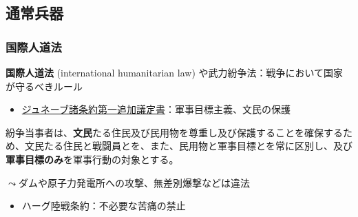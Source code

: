 \documentclass[
  xelatex,
  ja=standard]{bxjsarticle}
\providecommand{\tightlist}{%
  \setlength{\itemsep}{0pt}\setlength{\parskip}{0pt}}\usepackage{longtable,booktabs,array}
\begin{document}
\hypertarget{ux901aux5e38ux5175ux5668}{%
\subsection{通常兵器}\label{ux901aux5e38ux5175ux5668}}

\hypertarget{ux56fdux969bux4ebaux9053ux6cd5}{%
\subsubsection{国際人道法}\label{ux56fdux969bux4ebaux9053ux6cd5}}

\textbf{国際人道法} (international humanitarian law)
や武力紛争法：戦争において国家が守るべきルール

\begin{itemize}
\tightlist
\item
  \href{https://www.mofa.go.jp/mofaj/gaiko/k_jindo/giteisho.html}{ジュネーブ諸条約第一追加議定書}：軍事目標主義、文民の保護
\end{itemize}

\begin{tcolorbox}[enhanced jigsaw, opacityback=0, bottomtitle=1mm, arc=.35mm, opacitybacktitle=0.6, title=\textcolor{quarto-callout-note-color}{\faInfo}\hspace{0.5em}{\href{https://www1.doshisha.ac.jp/~karai/intlaw/docs/ap1.htm}{ジュネーブ諸条約第一追加議定書}　第48条}, bottomrule=.15mm, coltitle=black, toptitle=1mm, titlerule=0mm, leftrule=.75mm, colframe=quarto-callout-note-color-frame, breakable, left=2mm, rightrule=.15mm, toprule=.15mm, colbacktitle=quarto-callout-note-color!10!white, colback=white]

紛争当事者は、\textbf{文民}たる住民及び民用物を尊重し及び保護することを確保するため、文民たる住民と戦闘員とを、また、民用物と軍事目標とを常に区別し、及び\textbf{軍事目標のみ}を軍事行動の対象とする。

\end{tcolorbox}

\(\leadsto\)ダムや原子力発電所への攻撃、無差別爆撃などは違法

\begin{itemize}
\tightlist
\item
  ハーグ陸戦条約：不必要な苦痛の禁止
\end{itemize}
\end{document}
